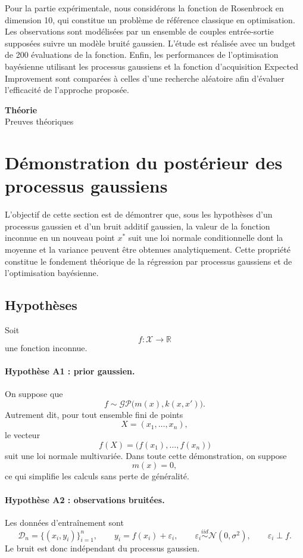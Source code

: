 \documentclass[12pt]{article}
\newcommand{\R}{\mathbb{R}}
\newcommand{\N}{\mathcal{N}}
\newcommand{\X}{\mathcal{X}}
\newcommand{\D}{\mathcal{D}}
\newcommand{\GP}{\mathcal{GP}}
\newcommand{\xs}{x^{*}}
\newcommand{\dividerpage}[2]{%
  \newpage \thispagestyle{empty}
  \vspace*{0.32\textheight}
  \begin{center}
    {\Huge\bfseries #1}\\[14pt]
    {\Large #2}
  \end{center}
  \newpage}
\begin{document}
Pour la partie expérimentale, nous considérons la fonction de Rosenbrock en
dimension 10, qui constitue un problème de référence classique en optimisation.
Les observations sont modélisées par un ensemble de couples entrée-sortie
supposées suivre un modèle bruité gaussien. L'étude est réalisée avec un budget de
200 évaluations de la fonction. Enfin, les performances de l'optimisation
bayésienne utilisant les processus gaussiens et la fonction d'acquisition Expected
Improvement sont comparées à celles d'une recherche aléatoire afin d'évaluer
l'efficacité de l'approche proposée.

\dividerpage{Théorie}{Preuves théoriques}

\section*{Démonstration du postérieur des processus gaussiens}

L'objectif de cette section est de démontrer que, sous les hypothèses d'un
processus gaussien et d'un bruit additif gaussien, la valeur de la fonction
inconnue en un nouveau point $\xs$ suit une loi normale conditionnelle dont la
moyenne et la variance peuvent être obtenues analytiquement. Cette propriété
constitue le fondement théorique de la régression par processus gaussiens et de
l'optimisation bayésienne.

\subsection*{Hypothèses}

Soit
\[
f : \X \to \R
\]
une fonction inconnue.

\paragraph{Hypothèse A1 : prior gaussien.}
On suppose que
\[
f \sim \GP\bigl(m(x), k(x,x')\bigr).
\]
Autrement dit, pour tout ensemble fini de points
\[
X = (x_1,\dots,x_n),
\]
le vecteur
\[
f(X) = \bigl(f(x_1),\dots,f(x_n)\bigr)
\]
suit une loi normale multivariée. Dans toute cette démonstration, on suppose
\[
m(x) = 0,
\]
ce qui simplifie les calculs sans perte de généralité.

\paragraph{Hypothèse A2 : observations bruitées.}
Les données d'entraînement sont
\[
\D_n = \{(x_i,y_i)\}_{i=1}^n,
\qquad
y_i = f(x_i) + \varepsilon_i,
\qquad
\varepsilon_i \stackrel{iid}{\sim} \N(0,\sigma^2),
\qquad
\varepsilon_i \perp f.
\]
Le bruit est donc indépendant du processus gaussien.
\end{document}
